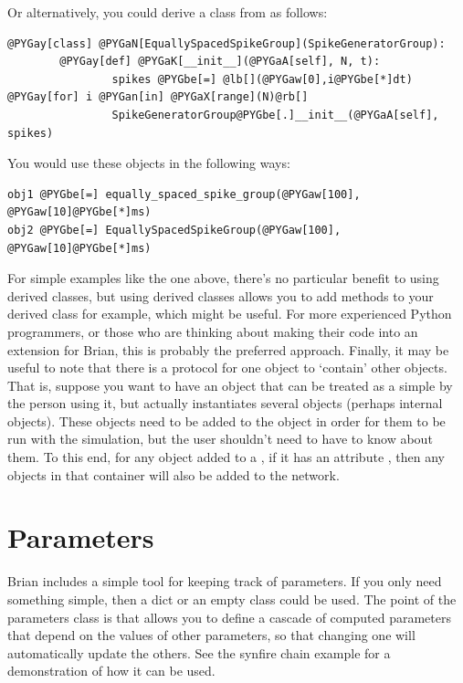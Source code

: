 \documentclass[letterpaper,10pt]{manual}
\begin{document}
Or alternatively, you could derive a class from \hyperlink{brian.SpikeGeneratorGroup}{}
as follows:

\begin{Verbatim}[commandchars=@\[\]]
@PYGay[class] @PYGaN[EquallySpacedSpikeGroup](SpikeGeneratorGroup):
        @PYGay[def] @PYGaK[__init__](@PYGaA[self], N, t):
                spikes @PYGbe[=] @lb[](@PYGaw[0],i@PYGbe[*]dt) @PYGay[for] i @PYGan[in] @PYGaX[range](N)@rb[]
                SpikeGeneratorGroup@PYGbe[.]__init__(@PYGaA[self], spikes)
\end{Verbatim}

You would use these objects in the following ways:

\begin{Verbatim}[commandchars=@\[\]]
obj1 @PYGbe[=] equally_spaced_spike_group(@PYGaw[100], @PYGaw[10]@PYGbe[*]ms)
obj2 @PYGbe[=] EquallySpacedSpikeGroup(@PYGaw[100], @PYGaw[10]@PYGbe[*]ms)
\end{Verbatim}

For simple examples like the one above, there's no particular benefit to
using derived classes, but using derived classes allows you to add
methods to your derived class for example, which might be useful. For
more experienced Python programmers, or those who are thinking about
making their code into an extension for Brian, this is probably the
preferred approach.
Finally, it may be useful to note that there is a protocol for one object
to `contain' other objects. That is, suppose you want to have an object
that can be treated as a simple \hyperlink{brian.NeuronGroup}{} by the person using it,
but actually instantiates several objects (perhaps internal \hyperlink{brian.Connection}{}
objects). These objects need to be added to the \hyperlink{brian.Network}{} object
in order for them to be run with the simulation, but the user shouldn't need
to have to know about them. To this end, for any object added to a
\hyperlink{brian.Network}{}, if it has an attribute , then any
objects in that container will also be added to the network.

\resetcurrentobjects


\section{Parameters}

Brian includes a simple tool for keeping track of parameters. If you only need
something simple, then a dict or an empty class could be used. The point of the
parameters class is that allows you to define a cascade of computed parameters
that depend on the values of other parameters, so that changing one will
automatically update the others. See the synfire chain example
 for a demonstration of how it can be used.
\end{document}
